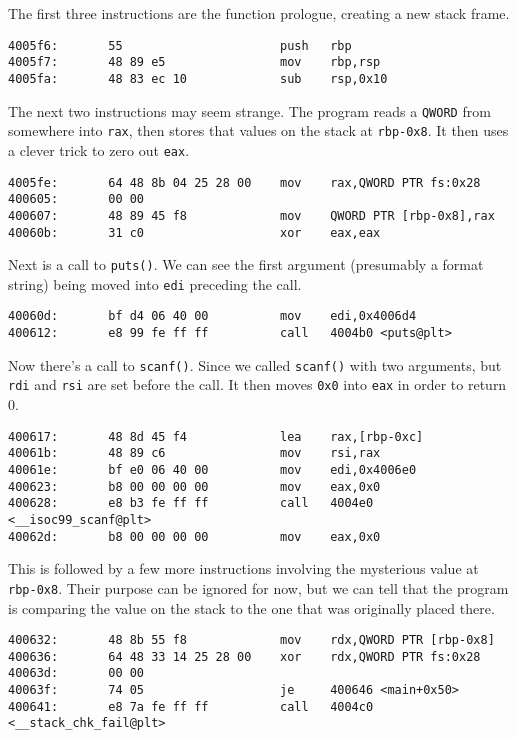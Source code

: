 The first three instructions are the function prologue, creating a new stack
frame.
\begin{lstlisting}
4005f6:       55                      push   rbp
4005f7:       48 89 e5                mov    rbp,rsp
4005fa:       48 83 ec 10             sub    rsp,0x10
\end{lstlisting}

The next two instructions may seem strange. The program reads a \texttt{QWORD}
from somewhere into \texttt{rax}, then stores that values on the stack at
\texttt{rbp-0x8}. It then uses a clever trick to zero out \texttt{eax}.
\begin{lstlisting}
4005fe:       64 48 8b 04 25 28 00    mov    rax,QWORD PTR fs:0x28
400605:       00 00 
400607:       48 89 45 f8             mov    QWORD PTR [rbp-0x8],rax
40060b:       31 c0                   xor    eax,eax
\end{lstlisting}

Next is a call to \texttt{puts()}. We can see the first argument (presumably a
format string) being moved into \texttt{edi} preceding the call.
\begin{lstlisting}
40060d:       bf d4 06 40 00          mov    edi,0x4006d4
400612:       e8 99 fe ff ff          call   4004b0 <puts@plt>
\end{lstlisting}

Now there's a call to \texttt{scanf()}. Since we called \texttt{scanf()} with
two arguments, but \texttt{rdi} and \texttt{rsi} are set before the call. It
then moves \texttt{0x0} into \texttt{eax} in order to return 0.

\begin{lstlisting}
400617:       48 8d 45 f4             lea    rax,[rbp-0xc]
40061b:       48 89 c6                mov    rsi,rax
40061e:       bf e0 06 40 00          mov    edi,0x4006e0
400623:       b8 00 00 00 00          mov    eax,0x0
400628:       e8 b3 fe ff ff          call   4004e0 <__isoc99_scanf@plt>
40062d:       b8 00 00 00 00          mov    eax,0x0
\end{lstlisting}

This is followed by a few more instructions involving the mysterious value at
\texttt{rbp-0x8}. Their purpose can be ignored for now, but we can tell that the
program is comparing the value on the stack to the one that was originally
placed there.
\begin{lstlisting}
400632:       48 8b 55 f8             mov    rdx,QWORD PTR [rbp-0x8]
400636:       64 48 33 14 25 28 00    xor    rdx,QWORD PTR fs:0x28
40063d:       00 00 
40063f:       74 05                   je     400646 <main+0x50>
400641:       e8 7a fe ff ff          call   4004c0 <__stack_chk_fail@plt>
\end{lstlisting}

